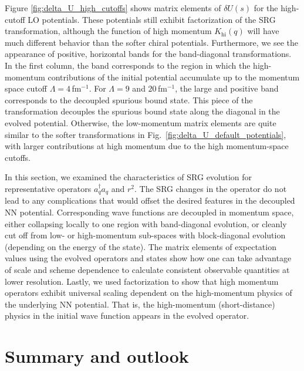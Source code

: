 \documentclass[10pt,aps,prc,floatfix,twocolumn,nofootinbib]{revtex4-1}
\newcommand{\ataq}{a^{\dagger}_q a_q}
\newcommand{\Khi}{K_{\text{hi}}}
\begin{document}
Figure \ref{fig:delta_U_high_cutoffs} shows matrix elements of $\delta U(s)$ for the high-cutoff LO potentials.
These potentials still exhibit factorization of the SRG transformation, although the function of high momentum $\Khi(q)$ will have much different behavior than the softer chiral potentials.
Furthermore, we see the appearance of positive, horizontal bands for the band-diagonal transformations.
In the first column, the band corresponds to the region in which the high-momentum contributions of the initial potential accumulate up to the momentum space cutoff $\Lambda=4$\,fm$^{-1}$.
For $\Lambda=9$ and $20$\,fm$^{-1}$, the large and positive band corresponds to the decoupled spurious bound state.
This piece of the transformation decouples the spurious bound state along the diagonal in the evolved potential.
Otherwise, the low-momentum matrix elements are quite similar to the softer transformations in Fig.~\ref{fig:delta_U_default_potentials}, with larger contributions at high momentum due to the high momentum-space cutoffs.


In this section, we examined the characteristics of SRG evolution for representative operators $\ataq$ and $r^2$.
The SRG changes in the operator do not lead to any complications that would offset the desired features in the decoupled NN potential.
Corresponding wave functions are decoupled in momentum space, either collapsing locally to one region with band-diagonal evolution, or cleanly cut off from low- or high-momentum sub-spaces with block-diagonal evolution (depending on the energy of the state).
The matrix elements of expectation values using the evolved operators and states show how one can take advantage of scale and scheme dependence to calculate consistent observable quantities at lower resolution.
Lastly, we used factorization to show that high momentum operators exhibit universal scaling dependent on the high-momentum physics of the underlying NN potential.
That is, the high-momentum (short-distance) physics in the initial wave function appears in the evolved operator.


\section{Summary and outlook}
\label{sec:summary}
\end{document}
